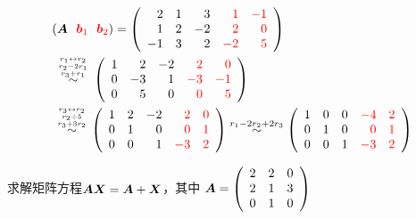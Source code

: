 \begin{jie}
  $$
  \begin{aligned}
    & (\boldsymbol{A}~~\textcolor{red}{{\boldsymbol{b}}_1}~~\textcolor{red}{{\boldsymbol{b}}_2})
    = \left(
      \begin{array}{rrrrr}
        2 & 1 & 3 &\textcolor{red}{ 1} & \textcolor{red}{-1}\\
        1 & 2 &-2 &\textcolor{red}{ 2} & \textcolor{red}{ 0}\\
        -1 & 3 & 2 &\textcolor{red}{-2} & \textcolor{red}{ 5}        
      \end{array}\right) \\ 
      & \overset{{r_1\leftrightarrow r_2 \atop r_2-2r_1}\atop  r_3+r_1}{\sim}
                               \left(
                               \begin{array}{rrrrr}
                                 1 & 2 &-2 & \textcolor{red}{ 2} & \textcolor{red}{ 0}\\
                                 0 &-3 & 1 & \textcolor{red}{-3} & \textcolor{red}{-1}\\
                                 0 & 5 & 0 & \textcolor{red}{ 0} & \textcolor{red}{ 5}        
                               \end{array}
                                                        \right) \\ 
    & \overset{{r_3\leftrightarrow r_2 \atop r_2\div5}\atop  r_3+3r_2}{\sim}
      \left(
      \begin{array}{rrrrr}
        1 & 2 &-2 &\textcolor{red}{ 2} &  \textcolor{red}{0}\\
        0 & 1 & 0 &\textcolor{red}{ 0} &  \textcolor{red}{1}\\
        0 & 0 & 1 &\textcolor{red}{-3} &  \textcolor{red}{2}        
      \end{array}
                              \right)   \overset{r_1-2r_2+2r_3}{\sim}
                              \left(
                              \begin{array}{rrrrr}
                                1 & 0 & 0 & \textcolor{red}{-4} & \textcolor{red}{2}\\
                                0 & 1 & 0 & \textcolor{red}{0} &  \textcolor{red}{1}\\
                                0 & 0 & 1 & \textcolor{red}{-3} &  \textcolor{red}{2}        
                              \end{array}
                                                       \right) 
  \end{aligned}
  $$
\end{jie}






\begin{li}
  求解矩阵方程$\boldsymbol{A}\boldsymbol{X}=\boldsymbol{A}+\boldsymbol{X}$，其中
  $
  \boldsymbol{A} = \left(
    \begin{array}{ccc}
      2&2&0\\
      2&1&3\\
      0&1&0
    \end{array}
  \right)
  $
\end{li}




